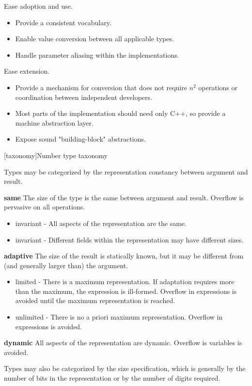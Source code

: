 Ease adoption and use.

\begin{itemize}
\item Provide a consistent vocabulary.
\item Enable value conversion between all applicable types.
\item Handle parameter aliasing within the implementations.
\end{itemize}

Ease extension.

\begin{itemize}
\item Provide a mechanism for conversion that does not require $n^{2}$ operations or coordination between independent developers.
\item Most parts of the implementation should need only C++, so provide a machine abstraction layer.
\item Expose sound "building-block" abstractions.
\end{itemize}

[taxonomy]{Number type taxonomy}

Types may be categorized by the representation constancy between argument and result.

\textbf{same}
The size of the type is the same between argument and result. Overflow is pervasive on all operations.
\begin{itemize}
\item invariant - All aspects of the representation are the same.
\item invariant - Different fields within the representation may have different sizes.
\end{itemize}
\textbf{adaptive}
The size of the result is statically known, but it may be different from (and generally larger than) the argument.
\begin{itemize}
\item limited - There is a maximum representation. If adaptation requires more than the maximum, the expression is ill-formed. Overflow in expressions is avoided until the maximum representation is reached.
\item unlimited - There is no a priori maximum representation. Overflow in expressions is avoided.
\end{itemize}
\textbf{dynamic}
All aspects of the representation are dynamic. Overflow is variables is avoided.

Types may also be categorized by the size specification, which is generally by the number of bits in the representation or by the number of digits required.